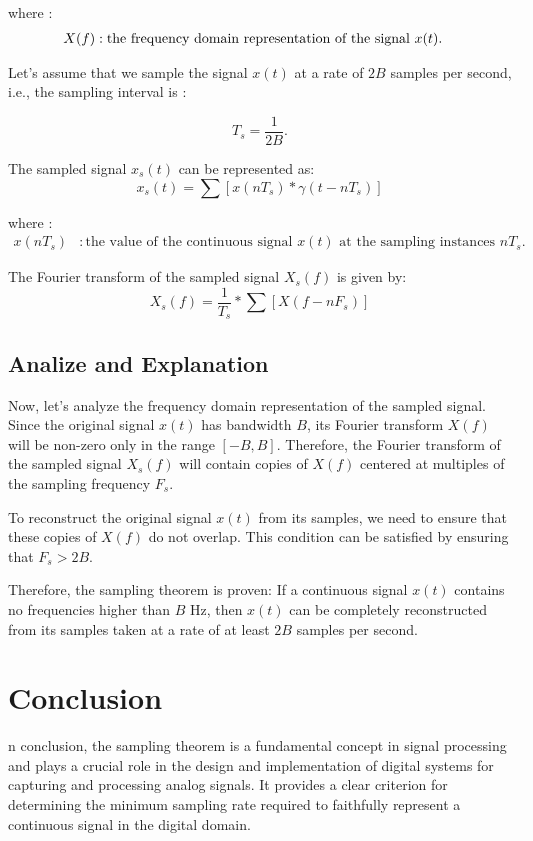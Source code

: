\documentclass{IEEEtran}
\begin{document}
	where :
	\begin{align*}
		X(f) & : \text{the frequency domain representation of the signal $ x(t) $.}
	\end{align*}
		
		
	 Let's assume that we sample the signal $ x(t) $ at a rate of $ 2B $ samples per second, i.e., the sampling interval is : 
	 
	 \begin{equation}
	 	 {T_s} = \frac{1}{2 B}.
	  \end{equation}
	 
	 The sampled signal \(x_s(t)\) can be represented as:
	\begin{equation}
	 	x_s(t) = \sum [x(n T_s) * \gamma(t - n T_s)]
	\end{equation}
	
	where :
	\begin{align*}
		x(nT_s) & : \text{the value of the continuous signal \(x(t)\) at the sampling instances \(n T_s\).}
	\end{align*}
	
	The Fourier transform of the sampled signal \(X_s(f)\) is given by:
	\begin{equation}
		X_s(f) = \frac{1} {T_s} * \sum [X(f - nF_s)]
	\end{equation}
	
	\subsection{Analize and Explanation}
	
	Now, let's analyze the frequency domain representation of the sampled signal. Since the original signal $ x(t) $ has bandwidth $ B $, its Fourier transform $ X(f) $ will be non-zero only in the range $ [-B, B] $. Therefore, the Fourier transform of the sampled signal $ X_s(f) $ will contain copies of $ X(f) $ centered at multiples of the sampling frequency $ F_s $.
	
	To reconstruct the original signal $ x(t) $ from its samples, we need to ensure that these copies of $ X(f) $ do not overlap. This condition can be satisfied by ensuring that $ F_s > 2B $.
	
	Therefore, the sampling theorem is proven: If a continuous signal $ x(t) $ contains no frequencies higher than $ B$  Hz, then $ x(t) $ can be completely reconstructed from its samples taken at a rate of at least $ 2B $ samples per second.
	
	\section{Conclusion}
	n conclusion, the sampling theorem is a fundamental concept in signal processing and plays a crucial role in the design and implementation of digital systems for capturing and processing analog signals. It provides a clear criterion for determining the minimum sampling rate required to faithfully represent a continuous signal in the digital domain.
	
	
\end{document}
